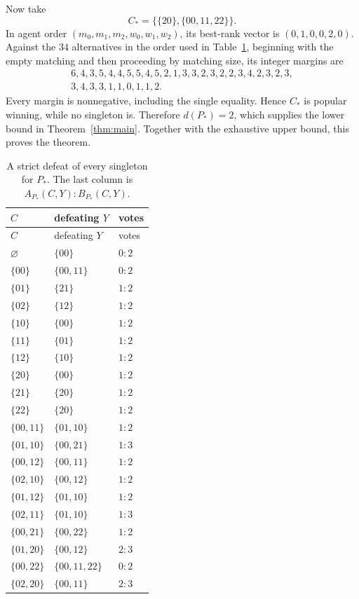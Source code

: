 \documentclass[11pt]{article}
\begin{document}
Now take
\[
 C_*=\bigl\{\{20\},\{00,11,22\}\bigr\}.
\]
In agent order $(m_0,m_1,m_2,w_0,w_1,w_2)$, its best-rank vector is
$(0,1,0,0,2,0)$.  Against the $34$ alternatives in the order used in
Table~\ref{tab:defeats}, beginning with the empty matching and then proceeding
by matching size, its integer margins are
\begin{multline*}
6,4,3,5,4,4,5,5,4,5,2,1,3,3,2,3,2,2,3,4,2,3,2,3,\\
3,4,3,3,1,1,0,1,1,2.
\end{multline*}
Every margin is nonnegative, including the single equality.  Hence $C_*$ is
popular winning, while no singleton is.  Therefore $d(P_*)=2$, which supplies
the lower bound in Theorem~\ref{thm:main}.  Together with the exhaustive upper
bound, this proves the theorem.

\begin{longtable}{@{}lll@{}}
\caption{A strict defeat of every singleton for $P_*$.
The last column is $A_{P_*}(C,Y):B_{P_*}(C,Y)$.}\label{tab:defeats}\\
\toprule
$C$&defeating $Y$&votes\\
\midrule
\endfirsthead
\toprule
$C$&defeating $Y$&votes\\
\midrule
\endhead
$\varnothing$&$\{00\}$&$0:2$\\
$\{00\}$&$\{00,11\}$&$0:2$\\
$\{01\}$&$\{21\}$&$1:2$\\
$\{02\}$&$\{12\}$&$1:2$\\
$\{10\}$&$\{00\}$&$1:2$\\
$\{11\}$&$\{01\}$&$1:2$\\
$\{12\}$&$\{10\}$&$1:2$\\
$\{20\}$&$\{00\}$&$1:2$\\
$\{21\}$&$\{20\}$&$1:2$\\
$\{22\}$&$\{20\}$&$1:2$\\
$\{00,11\}$&$\{01,10\}$&$1:2$\\
$\{01,10\}$&$\{00,21\}$&$1:3$\\
$\{00,12\}$&$\{00,11\}$&$1:2$\\
$\{02,10\}$&$\{00,12\}$&$1:2$\\
$\{01,12\}$&$\{01,10\}$&$1:2$\\
$\{02,11\}$&$\{01,10\}$&$1:3$\\
$\{00,21\}$&$\{00,22\}$&$1:2$\\
$\{01,20\}$&$\{00,12\}$&$2:3$\\
$\{00,22\}$&$\{00,11,22\}$&$0:2$\\
$\{02,20\}$&$\{00,11\}$&$2:3$\\

\end{longtable}
\end{document}
